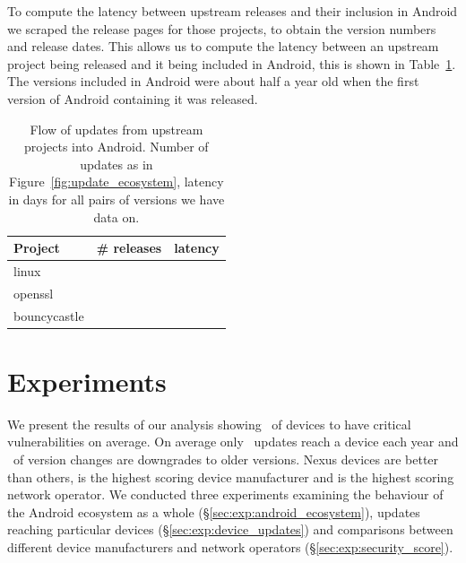 \documentclass[conference,a4paper,twoside]{IEEEtran}
\let\OldTodo\todo
\renewcommand{\todo}{\OldTodo[inline]}
\newcommand{\todolater}[1]{}%
\begin{document}
To compute the latency between upstream releases and their inclusion in Android we scraped the release pages for those projects, to obtain the version numbers and release dates.
This allows us to compute the latency between an upstream project being released and it being included in Android, this is shown in Table~\ref{tab:update_ecosystem}.
The versions included in Android were about half a year old when the first version of Android containing it was released.
\begin{table}
\centering
\normalsize
\begin{tabular}{l|r|r}
Project	&	\# releases	&	latency \\ \hline
linux	&	\linuxNumVersions	&	\linuxMeanUpdateLatency \\
openssl	&	\opensslNumVersions	&	\opensslMeanUpdateLatency \\
bouncycastle	&	\bouncycastleNumVersions	&	\bouncycastleMeanUpdateLatency \\
\end{tabular}
\caption{Flow of updates from upstream projects into Android. Number of updates as in Figure~\ref{fig:update_ecosystem}, latency in days for all pairs of versions we have data on.\todolater{scrape the other 26 websites... is it worth it?}}
\label{tab:update_ecosystem}
\end{table}






\section{Experiments}
\label{sec:results}
We present the results of our analysis showing \daMeanInsecurityPerc\ of devices to have critical vulnerabilities on average.
On average only \daUpdatesPerYear\ updates reach a device each year and \daPercUpdatesDowngrades\ of version changes are downgrades to older versions.
Nexus devices are better than others, \emph{\daSecScoreBestmanufacturer} is the highest scoring device manufacturer and \emph{\daSecScoreBestoperator} is the highest scoring network operator.
We conducted three experiments examining the behaviour of the Android ecosystem as a whole (\S\ref{sec:exp:android_ecosystem}), updates reaching particular devices (\S\ref{sec:exp:device_updates}) and comparisons between different device manufacturers and network operators (\S\ref{sec:exp:security_score}).
\end{document}
